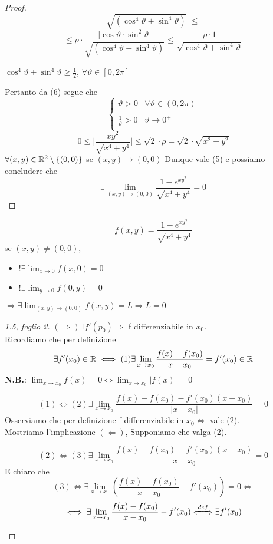\begin{exercise}[1b, foglio 2]
\begin{proof}
$$    {\sqrt{\left(\cos^4\vartheta +\sin^4\vartheta\right)}} \rvert \leq$$
    $$\leq \rho\cdot \frac{\lvert \cos\vartheta \cdot \sin^2\vartheta \rvert}{\sqrt{\left(\cos^4\vartheta +\sin^4\vartheta\right)}}
     \leq \frac{\rho \cdot 1}{\sqrt{\cos^4\vartheta + \sin^4\vartheta}}$$
    \begin{exercise}
      $\cos^4\vartheta +\sin^4\vartheta \geq \frac{1}{2}$, $\forall \vartheta \in [0,2\pi]$ 
    \end{exercise}
    Pertanto da (6) segue che $$\left\{\begin{array}{cl}
      \vartheta > 0 & \forall \vartheta \in (0,2\pi) \\ 
      \\
      \frac{1}{\vartheta} > 0 & \vartheta \to 0^{+} \\
    \end{array}\right.$$
    $$0 \leq \lvert \frac{xy^2}{\sqrt{x^4+y^4}} \rvert \leq \sqrt{2}\cdot\rho = \sqrt{2}\cdot\sqrt{x^2+y^2}$$
    $\forall (x,y) \in \mathbb{R}^2 \setminus \{(0,0)\}$ se $(x,y) \to (0,0)$
    Dunque vale (5) e possiamo concludere che $$\exists \lim_{(x,y) \to (0,0)} \frac{1-e^{xy^2}}{\sqrt{x^4+y^4}} = 0$$
  \end{proof}
\end{exercise}
$$f(x,y) = \frac{1-e^{xy^2}}{\sqrt{x^4+y^4}}$$
se $(x,y)\not = (0,0)$, 
\begin{itemize}
  \item $!\exists \lim_{x\to 0} f(x,0) = 0$
  \item $!\exists \lim_{y\to 0} f(0,y) = 0$
\end{itemize}
$\Rightarrow \exists \lim_{(x,y)\to (0,0)}f(x,y) = L \Rightarrow L = 0$
\begin{proof}[1.5, foglio 2]
  $(\Rightarrow) \exists f'(p_0) \Rightarrow $ f \ace differenziabile in $x_0$. \\
  Ricordiamo che per definizione
  $$\exists f'(x_0) \in \mathbb{R} \iff (1) \exists \lim_{x\to x_0} \frac{f(x)-f(x_0)}{x-x_0} = f'(x_0) \in \mathbb{R}$$
  \textbf{N.B.}: $\lim_{x\to x_0} f(x) = 0 \iff \lim_{x\to x_0} \lvert f(x) \rvert= 0$
  \begin{exercise}
    $$(1) \iff (2) \exists \lim_{x\to x_0} \frac{f(x)-f(x_0)-f'(x_0)(x-x_0)}{\lvert x-x_0\rvert} = 0$$
    Osserviamo che per definizione f \ace differenziabile in $x_0 \iff $ vale (2). \\
    Mostriamo l'implicazione $(\Leftarrow)$, Supponiamo che valga (2). 
  \end{exercise}
  \begin{exercise}
    $$(2) \iff (3) \exists \lim_{x\to x_0} \frac{f(x)-f(x_0)-f'(x_0)(x-x_0)}{x-x_0} = 0$$
    \ac{E} chiaro che $$(3) \iff \exists \lim_{x\to x_0}\left(\frac{f(x)-f(x_0)}{x-x_0} - f'(x_0)\right) = 0 \iff$$
    $$\iff \exists \lim_{x\to x_0} \frac{f(x)-f(x_0)}{x-x_0} -f'(x_0) \xLeftrightarrow{def} \exists f'(x_0)$$
  \end{exercise}
\end{proof}























